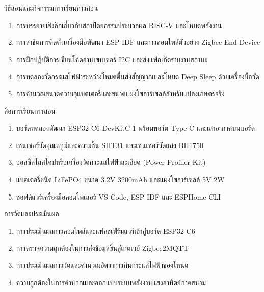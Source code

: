 \newpage

\begin{planbox}{วิธีสอนและกิจกรรมการเรียนการสอน}
\begin{enumerate}[topsep=1pt, itemsep=0.5pt, partopsep=0pt, parsep=0pt, leftmargin=1.5em]
    \item การบรรยายเชิงลึกเกี่ยวกับสถาปัตยกรรมประมวลผล RISC-V และโหมดพลังงาน
    \item การสาธิตการติดตั้งเครื่องมือพัฒนา ESP-IDF และการคอมไพล์ตัวอย่าง Zigbee End Device
    \item การฝึกปฏิบัติการเขียนโค้ดอ่านเซนเซอร์ I2C และส่งแพ็กเก็ตรายงานสถานะ
    \item การทดลองวัดกระแสไฟฟ้าระหว่างโหมดตื่นส่งสัญญาณและโหมด Deep Sleep ด้วยเครื่องมือวัด
    \item การคำนวณขนาดความจุแบตเตอรี่และขนาดแผงโซลาร์เซลล์สำหรับแปลงเกษตรจริง
\end{enumerate}
\end{planbox}

\begin{planbox}{สื่อการเรียนการสอน}
\begin{enumerate}[topsep=1pt, itemsep=0.5pt, partopsep=0pt, parsep=0pt, leftmargin=1.5em]
    \item บอร์ดทดลองพัฒนา ESP32-C6-DevKitC-1 พร้อมพอร์ต Type-C และเสาอากาศบนบอร์ด
    \item เซนเซอร์วัดอุณหภูมิและความชื้น SHT31 และเซนเซอร์วัดแสง BH1750
    \item ออสซิลโลสโคปหรือเครื่องวัดกระแสไฟฟ้าละเอียด (Power Profiler Kit)
    \item แบตเตอรี่ชนิด LiFePO4 ขนาด 3.2V 3200mAh และแผงโซลาร์เซลล์ 5V 2W
    \item ซอฟต์แวร์เครื่องมือคอมไพเลอร์ VS Code, ESP-IDF และ ESPHome CLI
\end{enumerate}
\end{planbox}

\begin{planbox}{การวัดและประเมินผล}
\begin{enumerate}[topsep=1pt, itemsep=0.5pt, partopsep=0pt, parsep=0pt, leftmargin=1.5em]
    \item การประเมินผลการคอมไพล์และแฟลชเฟิร์มแวร์เข้าสู่บอร์ด ESP32-C6
    \item การตรวจความถูกต้องในการส่งข้อมูลขึ้นสู่เกตเวย์ Zigbee2MQTT
    \item การประเมินผลการวัดและคำนวณอัตราการกินกระแสไฟฟ้าของโหนด
    \item ความถูกต้องในการคำนวณและออกแบบระบบพลังงานแสงอาทิตย์ภาคสนาม
\end{enumerate}
\end{planbox}

